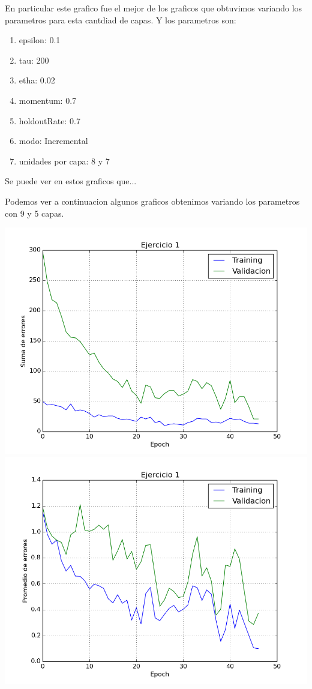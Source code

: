 En particular este grafico fue el mejor de los graficos que obtuvimos variando los parametros para esta cantdiad de capas. Y los parametros son:
\begin{enumerate}
\item epsilon: 0.1
\item tau: 200
\item etha: 0.02
\item momentum: 0.7
\item holdoutRate: 0.7
\item modo: Incremental
\item unidades por capa: 8 y 7
\end{enumerate}

Se puede ver en estos graficos que...

Podemos ver a continuacion algunos graficos obtenimos variando los parametros con 9 y 5 capas.


\includegraphics[scale=0.4]{img/ej100505195sum}
\includegraphics[scale=0.4]{img/ej100505195mean}


